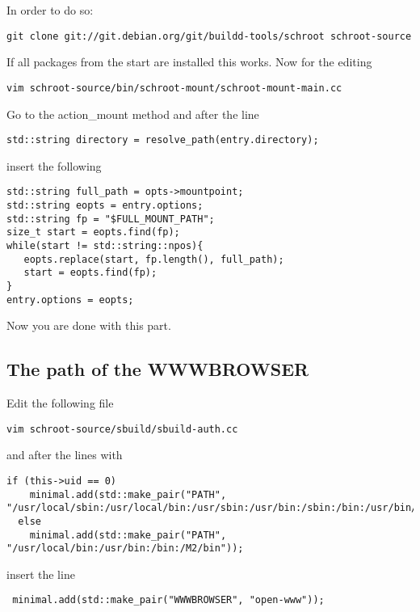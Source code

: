 \documentclass[a4paper]{book}
\begin{document}
In order to do so:

\begin{verbatim}
git clone git://git.debian.org/git/buildd-tools/schroot schroot-source
\end{verbatim}

If all packages from the start are installed this works.
Now for the editing

\begin{verbatim}
vim schroot-source/bin/schroot-mount/schroot-mount-main.cc
\end{verbatim}

Go to the action\_mount method and after the line

\begin{verbatim}
std::string directory = resolve_path(entry.directory);
\end{verbatim}

insert the following

\begin{verbatim}
std::string full_path = opts->mountpoint;
std::string eopts = entry.options;
std::string fp = "$FULL_MOUNT_PATH";
size_t start = eopts.find(fp);
while(start != std::string::npos){
   eopts.replace(start, fp.length(), full_path);
   start = eopts.find(fp);
}
entry.options = eopts;
\end{verbatim}


Now you are done with this part.

\subsection{The path of the WWWBROWSER}
Edit the following file

\begin{verbatim}
vim schroot-source/sbuild/sbuild-auth.cc
\end{verbatim}
and after the lines with

\begin{verbatim}
if (this->uid == 0)
    minimal.add(std::make_pair("PATH", "/usr/local/sbin:/usr/local/bin:/usr/sbin:/usr/bin:/sbin:/bin:/usr/bin/X11"));
  else
    minimal.add(std::make_pair("PATH", "/usr/local/bin:/usr/bin:/bin:/M2/bin"));
\end{verbatim}
insert the line

\begin{verbatim}
 minimal.add(std::make_pair("WWWBROWSER", "open-www"));
\end{verbatim}
\end{document}
